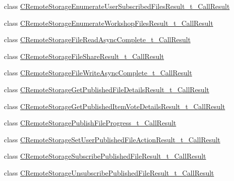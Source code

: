 \begin{DoxyCompactItemize}
class \hyperlink{class_valve_1_1_steamworks_1_1_c_remote_storage_enumerate_user_subscribed_files_result__t___call_result}{C\+Remote\+Storage\+Enumerate\+User\+Subscribed\+Files\+Result\+\_\+t\+\_\+\+Call\+Result}
\item 
class \hyperlink{class_valve_1_1_steamworks_1_1_c_remote_storage_enumerate_workshop_files_result__t___call_result}{C\+Remote\+Storage\+Enumerate\+Workshop\+Files\+Result\+\_\+t\+\_\+\+Call\+Result}
\item 
class \hyperlink{class_valve_1_1_steamworks_1_1_c_remote_storage_file_read_async_complete__t___call_result}{C\+Remote\+Storage\+File\+Read\+Async\+Complete\+\_\+t\+\_\+\+Call\+Result}
\item 
class \hyperlink{class_valve_1_1_steamworks_1_1_c_remote_storage_file_share_result__t___call_result}{C\+Remote\+Storage\+File\+Share\+Result\+\_\+t\+\_\+\+Call\+Result}
\item 
class \hyperlink{class_valve_1_1_steamworks_1_1_c_remote_storage_file_write_async_complete__t___call_result}{C\+Remote\+Storage\+File\+Write\+Async\+Complete\+\_\+t\+\_\+\+Call\+Result}
\item 
class \hyperlink{class_valve_1_1_steamworks_1_1_c_remote_storage_get_published_file_details_result__t___call_result}{C\+Remote\+Storage\+Get\+Published\+File\+Details\+Result\+\_\+t\+\_\+\+Call\+Result}
\item 
class \hyperlink{class_valve_1_1_steamworks_1_1_c_remote_storage_get_published_item_vote_details_result__t___call_result}{C\+Remote\+Storage\+Get\+Published\+Item\+Vote\+Details\+Result\+\_\+t\+\_\+\+Call\+Result}
\item 
class \hyperlink{class_valve_1_1_steamworks_1_1_c_remote_storage_publish_file_progress__t___call_result}{C\+Remote\+Storage\+Publish\+File\+Progress\+\_\+t\+\_\+\+Call\+Result}
\item 
class \hyperlink{class_valve_1_1_steamworks_1_1_c_remote_storage_set_user_published_file_action_result__t___call_result}{C\+Remote\+Storage\+Set\+User\+Published\+File\+Action\+Result\+\_\+t\+\_\+\+Call\+Result}
\item 
class \hyperlink{class_valve_1_1_steamworks_1_1_c_remote_storage_subscribe_published_file_result__t___call_result}{C\+Remote\+Storage\+Subscribe\+Published\+File\+Result\+\_\+t\+\_\+\+Call\+Result}
\item 
class \hyperlink{class_valve_1_1_steamworks_1_1_c_remote_storage_unsubscribe_published_file_result__t___call_result}{C\+Remote\+Storage\+Unsubscribe\+Published\+File\+Result\+\_\+t\+\_\+\+Call\+Result}

\end{DoxyCompactItemize}
